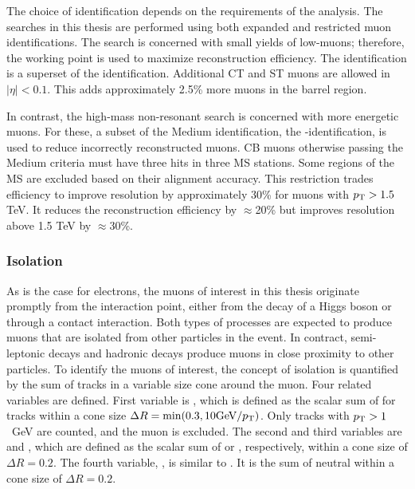 The choice of identification depends on the requirements of the analysis.
The searches in this thesis are performed using both expanded and restricted muon identifications.
The \hmm search is concerned with small yields of low-\pt muons; therefore, the  working point is used to maximize reconstruction efficiency.
The  identification is a superset of the  identification.
Additional CT and ST muons are allowed in $|\eta|<0.1$. This adds approximately 2.5\% more muons in the barrel region.
\cite{muonReco}

In contrast, the high-mass non-resonant search is concerned with more energetic muons.
For these, a subset of the Medium identification, the -\pt identification, is used to reduce incorrectly reconstructed muons.
CB muons otherwise passing the Medium criteria must have three hits in three MS stations.
Some regions of the MS are excluded based on their alignment accuracy.
This restriction trades efficiency to improve \pt resolution by approximately 30\% for muons with $p_\text{T}>1.5$ TeV.
It reduces the reconstruction efficiency by $\approx$20\% but improves \pt resolution above 1.5 TeV by $\approx$30\%.
\cite{muonReco}

\subsubsection{Isolation}

As is the case for electrons, the muons of interest in this thesis originate promptly from the interaction point, either from the decay of a Higgs boson or through a contact interaction.
Both types of processes are expected to produce muons that are isolated from other particles in the event.
In contract, semi-leptonic decays and hadronic decays produce muons in close proximity to other particles.
To identify the muons of interest, the concept of isolation is quantified by the sum of tracks in a variable size cone around the muon.
Four related variables are defined.
First variable is \ptvarconeMuon, which is defined as the scalar sum of \pt for tracks within a cone size $\Delta R=\text{min}(0.3,10\text{GeV}/p_\text{T})$. Only tracks with $p_\text{T}>1$~GeV are counted, and the muon \pt is excluded.
The second and third variables are \etcone and \ptcone, which are defined as the scalar sum of \et or \pt, respectively, within a cone size of $\Delta R=0.2$.
The fourth variable, \neutralcone, is similar to \etcone. It is the sum of neutral \et within a cone size of $\Delta R=0.2$.

